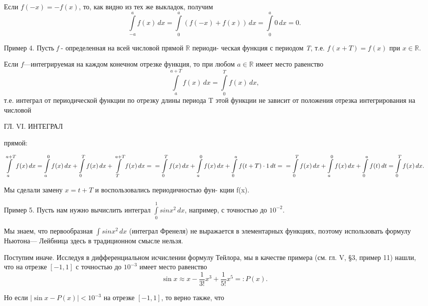 \documentclass[a4paper, 10pt]{book}
\begin{document}
    
    \par
    Если $f(-x) = -f(x)$, то, как видно из тех же выкладок, получим
    \[
    \int\limits_{-a}^{a} f(x) \,dx =
    \int\limits_{0}^{a} (f(-x) + f(x)) \,dx =
    \int\limits_{0}^{a} 0 \,dx = 0.
    \]


    \par
    Пример 4. Пусть \textit{f} - определенная на всей числовой прямой $\mathbb{R}$ периоди-
    ческая функция с периодом \textit{T}, т.е. $f(x+T)=f(x)$ при $x \in \mathbb{R}$.


    \par
    Если $f$—интегрируемая на каждом конечном отрезке функция, то при любом $a \in \mathbb{R}$ имеет место равенство
    \[
    \int\limits_{a}^{a+T} f(x) \,dx = \int\limits_{0}^{T} f(x) \,dx,
    \]
    т.е. интеграл от периодической функции по отрезку длины периода T этой функции не зависит от положения отрезка интегрирования на числовой

    \newpage
    \begin{center}
        ГЛ. VI. ИНТЕГРАЛ
    \end{center}

    \par\noindent
    прямой:

    
    $
    \displaystyle
    \int\limits_{a}^{a+T} f(x) \,dx = \int\limits_{a}^{0} f(x) \,dx + \int\limits_{0}^{T} f(x) \,dx + \int\limits_{T}^{a+T} f(x) \,dx = 
    \\
    \null\hfill =\int\limits_{0}^{T} f(x) \,dx + \int\limits_{a}^{0} f(x) \,dx + \int\limits_{0}^{a} f(t + T)\cdot1 \,dt=
    \\
    \null\hfill =\int\limits_{0}^{T} f(x) \,dx + \int\limits_{a}^{0} f(x) \,dx + \int\limits_{0}^{a} f(t) \,dt =\int\limits_{0}^{T} f(x) \,dx.
    $


    \par
    Мы сделали замену $x = t + T$ и воспользовались периодичностью фун-
    кции f(x).

    \par
    Пример 5. Пусть нам нужно вычислить интеграл $\int\limits_{0}^{1} sin{x^2} \,dx$, например, с точностью до $10^{-2}$.

    \par
    Мы знаем, что первообразная $\int sin{x^2} \,dx$ (интеграл Френеля) не выражается в элементарных функциях, поэтому использовать формулу Ньютона—
    Лейбница здесь в традиционном смысле нельзя.

    \par
    Поступим иначе. Исследуя в дифференциальном исчислении формулу Тейлора, мы в качестве примера (см. гл. V, \S 3, пример 11) нашли, что на отрезке $[-1, 1]$ с точностью до $10^{-3}$ имеет место равенство
    \[
    \sin{x} \approx x - \frac{1}{3!}x^{3} + \frac{1}{5!}x^{5}=:P(x).
    \]

    \par
    Но если $|\sin{x} - P(x)| < 10^{-3} $ на отрезке $[-1, 1]$, то верно также, что
    
\end{document}
